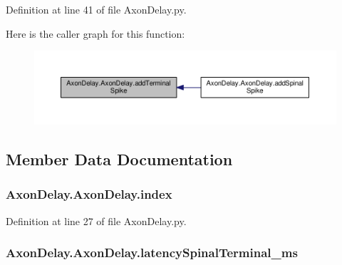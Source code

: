 Definition at line 41 of file Axon\-Delay.\-py.



Here is the caller graph for this function\-:\nopagebreak
\begin{figure}[H]
\begin{center}
\leavevmode
\includegraphics[width=350pt]{class_axon_delay_1_1_axon_delay_a49115bea963cde5e2c4317510d73cf7c_icgraph}
\end{center}
\end{figure}




\subsection{Member Data Documentation}
\hypertarget{class_axon_delay_1_1_axon_delay_a5dbb9b5002d4b54bf347f48337bdb1c6}{
\subsubsection[{index}]{\setlength{\rightskip}{0pt plus 5cm}Axon\-Delay.\-Axon\-Delay.\-index}}\label{class_axon_delay_1_1_axon_delay_a5dbb9b5002d4b54bf347f48337bdb1c6}


Definition at line 27 of file Axon\-Delay.\-py.

\hypertarget{class_axon_delay_1_1_axon_delay_aaa0b8daf2629cd7fa19d539fe2168d0f}{
\subsubsection[{latency\-Spinal\-Terminal\-\_\-ms}]{\setlength{\rightskip}{0pt plus 5cm}Axon\-Delay.\-Axon\-Delay.\-latency\-Spinal\-Terminal\-\_\-ms}}\label{class_axon_delay_1_1_axon_delay_aaa0b8daf2629cd7fa19d539fe2168d0f}


